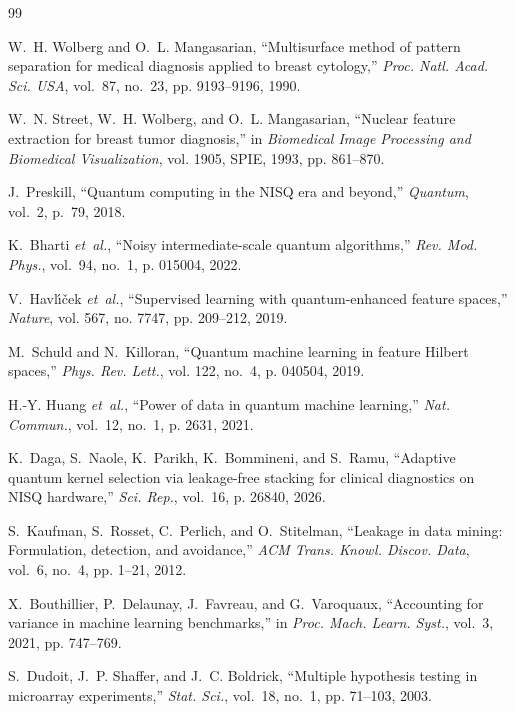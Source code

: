 \documentclass[journal,twocolumn]{IEEEtran}
\begin{document}

\begin{thebibliography}{99}

W.~H. Wolberg and O.~L. Mangasarian, ``Multisurface method of pattern separation for medical diagnosis applied to breast cytology,'' \emph{Proc. Natl. Acad. Sci. USA}, vol.~87, no.~23, pp. 9193--9196, 1990.

W.~N. Street, W.~H. Wolberg, and O.~L. Mangasarian, ``Nuclear feature extraction for breast tumor diagnosis,'' in \emph{Biomedical Image Processing and Biomedical Visualization}, vol. 1905, SPIE, 1993, pp. 861--870.

J.~Preskill, ``Quantum computing in the NISQ era and beyond,'' \emph{Quantum}, vol.~2, p.~79, 2018.

K.~Bharti \emph{et~al.}, ``Noisy intermediate-scale quantum algorithms,'' \emph{Rev. Mod. Phys.}, vol.~94, no.~1, p. 015004, 2022.

V.~Havl{\'\i}{\v{c}}ek \emph{et~al.}, ``Supervised learning with quantum-enhanced feature spaces,'' \emph{Nature}, vol. 567, no. 7747, pp. 209--212, 2019.

M.~Schuld and N.~Killoran, ``Quantum machine learning in feature Hilbert spaces,'' \emph{Phys. Rev. Lett.}, vol. 122, no.~4, p. 040504, 2019.

H.-Y. Huang \emph{et~al.}, ``Power of data in quantum machine learning,'' \emph{Nat. Commun.}, vol.~12, no.~1, p. 2631, 2021.

K.~Daga, S.~Naole, K.~Parikh, K.~Bommineni, and S.~Ramu, ``Adaptive quantum kernel selection via leakage-free stacking for clinical diagnostics on NISQ hardware,'' \emph{Sci. Rep.}, vol.~16, p. 26840, 2026.

S.~Kaufman, S.~Rosset, C.~Perlich, and O.~Stitelman, ``Leakage in data mining: Formulation, detection, and avoidance,'' \emph{ACM Trans. Knowl. Discov. Data}, vol.~6, no.~4, pp. 1--21, 2012.

X.~Bouthillier, P.~Delaunay, J.~Favreau, and G.~Varoquaux, ``Accounting for variance in machine learning benchmarks,'' in \emph{Proc. Mach. Learn. Syst.}, vol.~3, 2021, pp. 747--769.

S.~Dudoit, J.~P. Shaffer, and J.~C. Boldrick, ``Multiple hypothesis testing in microarray experiments,'' \emph{Stat. Sci.}, vol.~18, no.~1, pp. 71--103, 2003.


\end{thebibliography}
\end{document}

